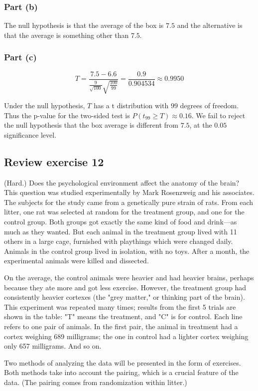 \documentclass[11pt]{article}
\begin{document}
\subsubsection*{Part (b)}
The null hypothesis is that the average of the box is $7.5$ and the alternative is that the average is something other than $7.5$.
\subsubsection*{Part (c)}
$$T= \frac{7.5 - 6.6}{\frac{9}{\sqrt{100}}\sqrt{\frac{100}{99}}} = \frac{0.9}{0.904534} \approx 0.9950$$

Under the null hypothesis, $T$ has a t distribution with $99$ degrees of freedom.  Thus the p-value for the two-sided test is $ P(t_{99} \geq T) \approx 0.16$.  We fail to reject the null hypothesis that the box average is different from $7.5$, at the $0.05$ significance level.

\subsection*{Review exercise 12} %
(Hard.) Does the psychological environment affect the anatomy of the brain?
This question was studied experimentally by Mark Rosenzweig and his associates.
The subjects for the study came from a genetically pure strain of rats.
From each litter, one rat was selected at random for the treatment group, and one for the control group.
Both groups got exactly the same kind of food and drink---as much as they wanted.
But each animal in the treatment group lived with 11 others in a large cage, furnished with playthings which were changed daily.
Animals in the control group lived in isolation, with no toys.
After a month, the experimental animals were killed and dissected.

On the average, the control animals were heavier and had heavier brains, perhaps because they ate more and got less exercise.
However, the treatment group had consistently heavier cortexes (the "grey matter," or thinking part of the brain).
This experiment was repeated many times; results from the first 5 trials are shown in the table: "T" means the treatment, and "C" is for control.
Each line refers to one pair of animals.
In the first pair, the animal in treatment had a cortex weighing 689 milligrams; the one in control had a lighter cortex weighing only 657 milligrams.  And so on.

Two methods of analyzing the data will be presented in the form of exercises.
Both methods take into account the pairing, which is a crucial feature of the data.
(The pairing comes from randomization within litter.)
\end{document}
